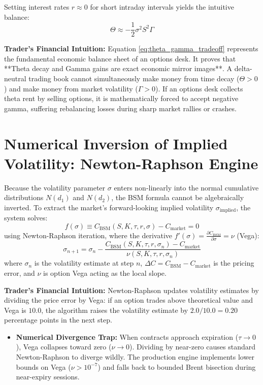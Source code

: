 Setting interest rates $r \approx 0$ for short intraday intervals yields the intuitive balance:
\begin{equation}
    \Theta \approx -\frac{1}{2} \sigma^2 S^2 \Gamma
    \label{eq:theta_gamma_tradeoff}
\end{equation}

\noindent
\textbf{Trader's Financial Intuition:}
Equation \eqref{eq:theta_gamma_tradeoff} represents the fundamental economic balance sheet of an options desk. It proves that **Theta decay and Gamma gains are exact economic mirror images**. A delta-neutral trading book cannot simultaneously make money from time decay ($\Theta > 0$) and make money from market volatility ($\Gamma > 0$). If an options desk collects theta rent by selling options, it is mathematically forced to accept negative gamma, suffering rebalancing losses during sharp market rallies or crashes.

\section{Numerical Inversion of Implied Volatility: Newton-Raphson Engine}
\label{sec:iv_inversion_algorithm}

Because the volatility parameter $\sigma$ enters non-linearly into the normal cumulative distributions $N(d_1)$ and $N(d_2)$, the BSM formula cannot be algebraically inverted. To extract the market's forward-looking implied volatility $\sigma_{\text{implied}}$, the system solves:
\begin{equation}
    f(\sigma) \equiv C_{\text{BSM}}(S, K, \tau, r, \sigma) - C_{\text{market}} = 0
\end{equation}
using Newton-Raphson iteration, where the derivative $f'(\sigma) = \frac{\partial C_{\text{BSM}}}{\partial \sigma} = \nu$ (Vega):
\begin{equation}
    \sigma_{n+1} = \sigma_n - \frac{C_{\text{BSM}}(S, K, \tau, r, \sigma_n) - C_{\text{market}}}{\nu(S, K, \tau, r, \sigma_n)}
    \label{eq:newton_raphson_iv}
\end{equation}
where $\sigma_n$ is the volatility estimate at step $n$, $\Delta C = C_{\text{BSM}} - C_{\text{market}}$ is the pricing error, and $\nu$ is option Vega acting as the local slope.

\noindent
\textbf{Trader's Financial Intuition:}
Newton-Raphson updates volatility estimates by dividing the price error by Vega: if an option trades  above theoretical value and Vega is $10.0$, the algorithm raises the volatility estimate by $2.0 / 10.0 = 0.20$ percentage points in the next step. 
\begin{itemize}
    \item \textbf{Numerical Divergence Trap:} When contracts approach expiration ($\tau \to 0$), Vega collapses toward zero ($\nu \to 0$). Dividing by near-zero causes standard Newton-Raphson to diverge wildly. The production engine implements lower bounds on Vega ($\nu > 10^{-7}$) and falls back to bounded Brent bisection during near-expiry sessions.
\end{itemize}

